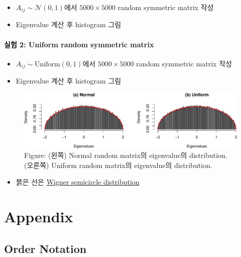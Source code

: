 \documentclass[
  letterpaper,
  DIV=11,
  numbers=noendperiod]{scrreprt}
\providecommand{\tightlist}{%
  \setlength{\itemsep}{0pt}\setlength{\parskip}{0pt}}
\theoremstyle{definition}
\theoremstyle{plain}
\theoremstyle{plain}
\theoremstyle{definition}
\theoremstyle{plain}
\theoremstyle{definition}
\theoremstyle{remark}
\begin{document}
\begin{itemize}
\item
  \(A_{ij} \sim \mathcal{N}(0,1)\)에서 \(5000\times 5000\) random
  symmetric matrix 작성
\item
  Eigenvalue 계산 후 histogram 그림
\end{itemize}

\subsection{실험 2: Uniform random symmetric
matrix}\label{uxc2e4uxd5d8-2-uniform-random-symmetric-matrix}

\begin{itemize}
\item
  \(A_{ij} \sim \text{Uniform}(0,1)\)에서 \(5000\times 5000\) random
  symmetric matrix 작성
\item
  Eigenvalue 계산 후 histogram 그림
\end{itemize}

\begin{figure}[H]

{\centering \includegraphics[width=0.7\linewidth,height=\textheight,keepaspectratio]{rmatrices_files/figure-pdf/unnamed-chunk-2-1.pdf}

}

\caption{Figure: (왼쪽) Normal random matrix의 eigenvalue의
distribution. (오른쪽) Uniform random matrix의 eigenvalue의
distribution.}

\end{figure}%

\begin{itemize}
\tightlist
\item
  붉은 선은
  \href{https://en.wikipedia.org/wiki/Wigner_semicircle_distribution}{Wigner
  semicircle distribution}
\end{itemize}

\part{Appendix}

\chapter{Order Notation}\label{order-notation}
\end{document}
